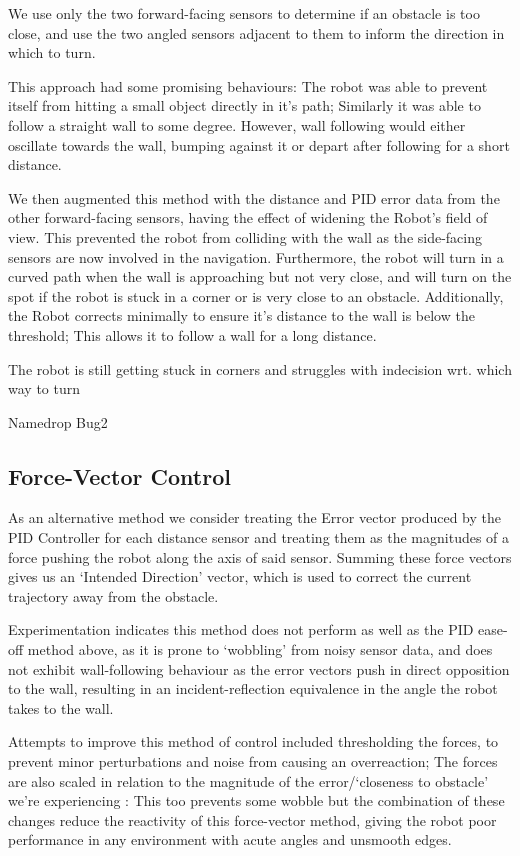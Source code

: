 \documentclass[11pt,a4wide]{article}
\begin{document}
We use only the two forward-facing sensors to determine if an obstacle is too close, 
and use the two angled sensors adjacent to them to inform the direction in which to 
turn.

This approach had some promising behaviours: The robot was able to prevent itself 
from hitting a small object directly in it's path; Similarly it was able to follow 
a straight wall to some degree. However, wall following would either oscillate 
towards the wall, bumping against it or depart after following for a short distance. 


We then augmented this method with the distance and PID error data from the other
forward-facing sensors, having the effect of widening the Robot's field of view.
This prevented the robot from colliding with the wall as the side-facing sensors 
are now involved in the navigation. Furthermore, the robot will turn in a curved path
when the wall is approaching but not very close, and will turn on the spot if the 
robot is stuck in a corner or is very close to an obstacle. Additionally, the Robot 
corrects minimally to ensure it's distance to the wall is below the threshold; This 
allows it to follow a wall for a long distance.


The robot is still getting stuck in corners and struggles with indecision wrt. which way to turn

Namedrop Bug2

\subsection{Force-Vector Control}

As an alternative method we consider treating the Error vector produced by the
PID Controller for each distance sensor and treating them as the magnitudes of a 
force pushing the robot along the axis of said sensor. Summing these force vectors
gives us an `Intended Direction' vector, which is used to correct the current 
trajectory away from the obstacle.

Experimentation indicates this method does not perform as well as the PID ease-off 
method above, as it is prone to `wobbling' from noisy sensor data, and does not
exhibit wall-following behaviour as the error vectors push in direct opposition to 
the wall, resulting in an incident-reflection equivalence in the angle the robot
takes to the wall.

Attempts to improve this method of control included thresholding the forces, to 
prevent minor perturbations and noise from causing an overreaction; The forces are 
also scaled in relation to the magnitude of the error/`closeness to obstacle' we're 
experiencing : This too prevents some wobble but the combination of these changes 
reduce the reactivity of this force-vector method, giving the robot poor performance 
in any environment with acute angles and unsmooth edges.
\end{document}
